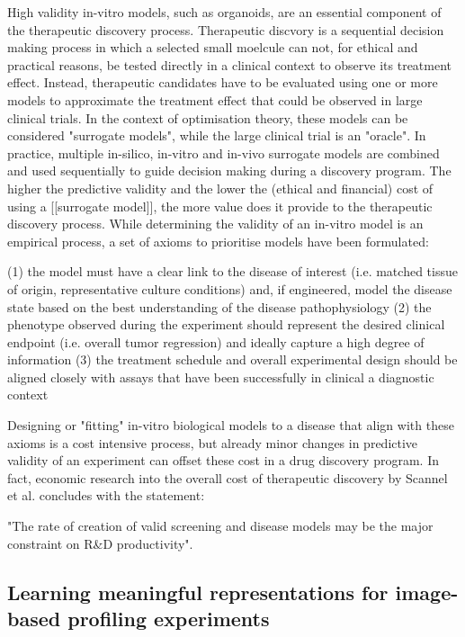 High validity in-vitro models, such as organoids, are an essential component of the therapeutic discovery process. Therapeutic discvory is a sequential decision making process in which a selected small moelcule can not, for ethical and practical reasons, be tested directly in a clinical context to observe its treatment effect. Instead, therapeutic candidates have to be evaluated using one or more models to approximate the treatment effect that could be observed in large clinical trials. In the context of optimisation theory, these models can be considered "surrogate models", while the large clinical trial is an "oracle". In practice, multiple in-silico, in-vitro and in-vivo surrogate models are combined and used sequentially to guide decision making during a discovery program. The higher the predictive validity and the lower the (ethical and financial) cost of using a [[surrogate model]], the more value does it provide to the therapeutic discovery process. While determining the validity of an in-vitro model is an empirical process, a set of axioms to prioritise models have been formulated: 

(1) the model must have a clear link to the disease of interest (i.e. matched tissue of origin, representative culture conditions) and, if engineered, model the disease state based on the best understanding of the disease pathophysiology
(2) the phenotype observed during the experiment should represent the desired clinical endpoint (i.e. overall tumor regression) and ideally capture a high degree of information
(3) the treatment schedule and overall experimental design should be aligned closely with assays that have been successfully in clinical a diagnostic context

Designing or "fitting" in-vitro biological models to a disease that align with these axioms is a cost intensive process, but already minor changes in predictive validity of an experiment can offset these cost in a drug discovery program. In fact, economic research into the overall cost of therapeutic discovery by Scannel et al. concludes with the statement:

"The rate of creation of valid screening and disease models may be the major constraint on R&D productivity".  

\subsection{Learning meaningful representations for image-based profiling experiments}

\subsection{}
